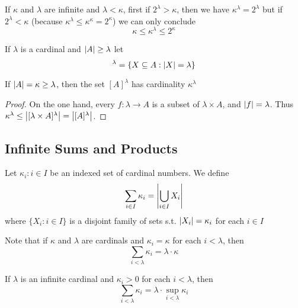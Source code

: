 \documentclass[11pt]{article}
\begin{document}
If \(\kappa\) and \(\lambda\) are infinite and \(\lambda<\kappa\), first if \(2^\lambda>\kappa\), then we
have \(\kappa^\lambda=2^\lambda\) but if \(2^\lambda<\kappa\) (because
\(\kappa^\lambda\le\kappa^\kappa=2^\kappa\)) we can only conclude
\begin{equation*}
\kappa\le\kappa^\lambda\le 2^\kappa
\end{equation*}

If \(\lambda\) is a cardinal and \(\abs{A}\ge\lambda\) let
\begin{equation*}
[A]^\lambda=\{X\subseteq A:\abs{X}=\lambda\}
\end{equation*}

\begin{lemma}[]
If \(\abs{A}=\kappa\ge\lambda\), then the set \([A]^\lambda\) has
cardinality \(\kappa^\lambda\)
\end{lemma}

\begin{proof}
On the one hand, every \(f:\lambda\to A\) is a subset of \(\lambda\times A\),
and \(\abs{f}=\lambda\). Thus \(\kappa^\lambda\le\abs{[\lambda\times A]^\lambda}=\abs{[A]^\lambda}\).
\end{proof}

\subsection{Infinite Sums and Products}
\label{sec:org9eb413f}
Let \(\kappa_i:i\in I\) be an indexed set of cardinal numbers. We define
\begin{equation*}
\displaystyle\sum_{i\in I}\kappa_i=\abs{\displaystyle\bigcup_{i\in I}X_i}
\end{equation*}
where \(\{X_i:i\in I\}\) is a disjoint family of sets s.t.
\(\abs{X_i}=\kappa_i\) for each \(i\in I\)

Note that if \(\kappa\) and \(\lambda\) are cardinals and \(\kappa_i=\kappa\) for each
\(i<\lambda\), then
\begin{equation*}
\displaystyle\sum_{i<\lambda}\kappa_i=\lambda\cdot\kappa
\end{equation*}

\begin{lemma}[]
If \(\lambda\) is an infinite cardinal and \(\kappa_i>0\) for each \(i<\lambda\), then
\begin{equation*}
\displaystyle\sum_{i<\lambda}\kappa_i=\lambda\cdot\sup_{i<\lambda}\kappa_i
\end{equation*}
\end{lemma}
\end{document}

